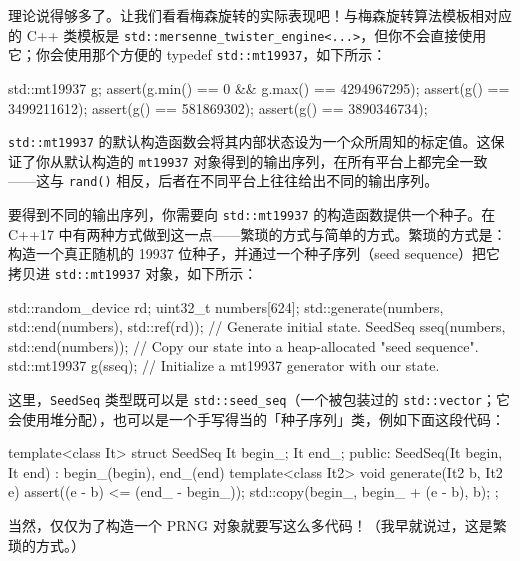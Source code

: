 理论说得够多了。让我们看看梅森旋转的实际表现吧！与梅森旋转算法模板相对应的 C++ 类模板是 \texttt{std::\allowbreak{}mersenne\_\allowbreak{}twister\_\allowbreak{}engine<...>}，但你不会直接使用它；你会使用那个方便的 typedef \texttt{std::\allowbreak{}mt19937}，如下所示：

\begin{codebox}[cpp]
     std::mt19937 g;
     assert(g.min() == 0 && g.max() == 4294967295);
     assert(g() == 3499211612);
     assert(g() == 581869302);
     assert(g() == 3890346734);
\end{codebox}

\texttt{std::\allowbreak{}mt19937} 的默认构造函数会将其内部状态设为一个众所周知的标定值。这保证了你从默认构造的 \texttt{mt19937} 对象得到的输出序列，在所有平台上都完全一致——这与 \texttt{rand(\allowbreak{})\allowbreak{}} 相反，后者在不同平台上往往给出不同的输出序列。

要得到不同的输出序列，你需要向 \texttt{std::\allowbreak{}mt19937} 的构造函数提供一个种子。在 C++17 中有两种方式做到这一点——繁琐的方式与简单的方式。繁琐的方式是：构造一个真正随机的 19937 位种子，并通过一个种子序列（seed sequence）把它拷贝进 \texttt{std::\allowbreak{}mt19937} 对象，如下所示：

\begin{codebox}[cpp]
     std::random_device rd;
     uint32_t numbers[624];
     std::generate(numbers, std::end(numbers), std::ref(rd));
       // Generate initial state.
     SeedSeq sseq(numbers, std::end(numbers));
       // Copy our state into a heap-allocated "seed sequence".
     std::mt19937 g(sseq);
       // Initialize a mt19937 generator with our state.
\end{codebox}

这里，\texttt{Seed\allowbreak{}Seq} 类型既可以是 \texttt{std::\allowbreak{}seed\_\allowbreak{}seq}（一个被包装过的 \texttt{std::\allowbreak{}vector}；它会使用堆分配），也可以是一个手写得当的「种子序列」类，例如下面这段代码：

\begin{codebox}[cpp]
     template<class It>
     struct SeedSeq {
       It begin_;
       It end_;
     public:
       SeedSeq(It begin, It end) : begin_(begin), end_(end) {}
       template<class It2>
       void generate(It2 b, It2 e) {
         assert((e - b) <= (end_ - begin_));
         std::copy(begin_, begin_ + (e - b), b);
       }
     };
\end{codebox}

当然，仅仅为了构造一个 PRNG 对象就要写这么多代码！（我早就说过，这是繁琐的方式。）

